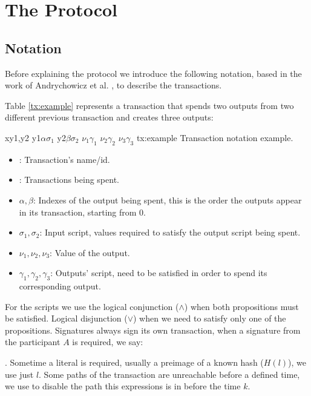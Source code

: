 \section{The Protocol}
\subsection{Notation}
Before explaining the protocol we introduce the following notation, based
  in the work of Andrychowicz et al. \cite{andrychowicz2014secure}, to describe
  the transactions.

Table \ref{tx:example} represents a transaction that spends two outputs from
  two different previous transaction and creates three outputs:

  \transaction
    {x}{y1,y2}
      {y1}{$\alpha$}{$\sigma_1$}
      {y2}{$\beta$}{$\sigma_2$}
      \stopinputs
      {$\nu_1$}{$\gamma_1$}
      {$\nu_2$}{$\gamma_2$}
      {$\nu_3$}{$\gamma_3$}
      \stopoutputs
      {tx:example}
      {Transaction notation example.}

\begin{itemize}
    \item {}: Transaction's name/id.
    \item {}: Transactions being spent.
    \item $\alpha,\beta$: Indexes of the output being spent, this is the order
                            the outputs appear in its transaction, starting from
                            0.
    \item $\sigma_1,\sigma_2$: Input script, values required to satisfy the
                                output script being spent.
    \item $\nu_1,\nu_2,\nu_3$: Value of the output.
    \item $\gamma_1, \gamma_2, \gamma_3$: Outputs' script, need to be satisfied
                                          in order to spend its corresponding
                                          output.
\end{itemize}

For the scripts we use the logical conjunction ($\wedge$) when both propositions
  must be satisfied.
Logical disjunction ($\vee$) when we need to satisfy only one of the
  propositions.
Signatures always sign its own transaction, when a signature from the
  participant $A$ is required, we say: \signature{A}.
Sometime a literal is required, usually a preimage of a known hash ($H(l)$), we
  use just $l$. Some paths of the transaction are unreachable before a defined
  time, we use  to disable the path this expressions is in before the
  time $k$.

